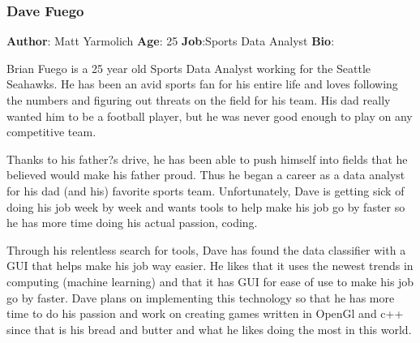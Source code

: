 \documentclass[12pt,oneside,letterpaper]{article}
\begin{document}
\subsubsection{Dave Fuego}
\textbf{Author}: Matt Yarmolich\newline
\textbf{Age}: 25\newline
\textbf{Job}:Sports Data Analyst\newline
\textbf{Bio}:\newline
\par Brian Fuego is a 25 year old Sports Data Analyst working for the Seattle Seahawks. He
has been an avid sports fan for his entire life and loves following the numbers and figuring out threats on the field for his team. His dad really wanted him to be a football player, but he was never good enough to play on any competitive team.
\par Thanks to his father?s drive, he has been able to push himself into fields that he believed would make his father proud. Thus he began a career as a data analyst for his dad (and his) favorite sports team. Unfortunately, Dave is getting sick of doing his job week by week and wants tools to help make his job go by faster so he has more time doing his actual passion, coding.
\par Through his relentless search for tools, Dave has found the data classifier with a GUI that helps make his job way easier. He likes that it uses the newest trends in computing (machine learning) and that it has GUI for ease of use to make his job go by faster. Dave plans on implementing this technology so that he has more time to do his passion and work on creating games written in OpenGl and c++ since that is his bread and butter and what he likes doing the most in this world.\newline
\end{document}
